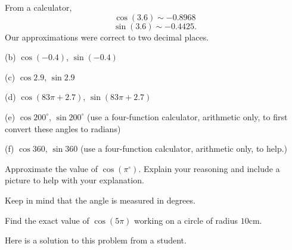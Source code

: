 \documentclass{ximera}
\begin{document}
\begin{question}
\begin{explanation}
From a calculator,
\[
   \cos (3.6) \sim -0.8968
\]
\[
    \sin(3.6) \sim -0.4425 .
\]
Our approximations were correct to two decimal places.

\end{explanation}

(b) $\cos (-0.4)$,  $\sin (-0.4)$ %

(c) $\cos 2.9$, $\sin 2.9$ %

(d) $\cos (83\pi + 2.7)$, $\sin (83\pi+2.7)$ 

(e) $\cos 200^\circ$, $\sin 200^\circ$ (use a four-function calculator, arithmetic only, to first convert these angles to radians)

(f) $\cos 360$, $\sin 360$ (use a four-function calculator, arithmetic only, to help.)


 
 

\end{question}

\begin{question} \label{Q2:Cosine}
Approximate the value of $\cos (\pi^\circ)$. Explain your reasoning and include a picture to help with your explanation.
\begin{hint}
Keep in mind that the angle is measured in degrees.
\end{hint}
\end{question}



\begin{example}  \label{Exsfs4hkj:Cosine}
Find the exact value of $\cos (5\pi)$ working on a circle of radius $10$cm.

\begin{explanation}

Here is a solution to this problem from a student.

 
\begin{onlineOnly}
    \begin{center}
\end{center}
\end{onlineOnly}

\end{explanation}

\end{example}
\end{document}
